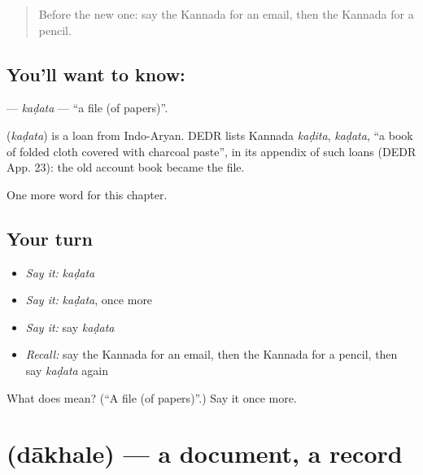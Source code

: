 \label{lesson:KA-C186-kadata}



\begin{quote}
Before the new one: say the Kannada for an email, then the Kannada for a pencil.
\end{quote}

\subsection*{You'll want to know: }
\textbf{} — \emph{kaḍata} — \textquotedblleft{}a file (of papers)\textquotedblright{}.

\begin{cousinweb}
\textbf{} (\emph{kaḍata}) is a loan from Indo-Aryan. DEDR lists Kannada \emph{kaḍita}, \emph{kaḍata}, \textquotedblleft{}a book of folded cloth covered with charcoal paste\textquotedblright{}, in its appendix of such loans (DEDR App. 23): the old account book became the file.
\end{cousinweb}

\begin{grammarlens}[title={What you've built}]
One more word for this chapter.
\end{grammarlens}

\subsection*{Your turn}
\begin{itemize}
\raggedright
  \item \emph{Say it:} \emph{kaḍata}
  \item \emph{Say it:} \emph{kaḍata}, once more
  \item \emph{Say it:} say \emph{kaḍata}
  \item \emph{Recall:} say the Kannada for an email, then the Kannada for a pencil, then say \emph{kaḍata} again
\end{itemize}

\begin{tcolorbox}[breakable,colback=teal!4,colframe=teal!35!black,title={Before you move on}]
What does  mean? (\textquotedblleft{}A file (of papers)\textquotedblright{}.) Say it once more.
\end{tcolorbox}
\section[\texorpdfstring{\kn{ದಾಖಲೆ} (dākhale)}{ದಾಖಲೆ (dākhale)}]{ (dākhale) — a document, a record}

